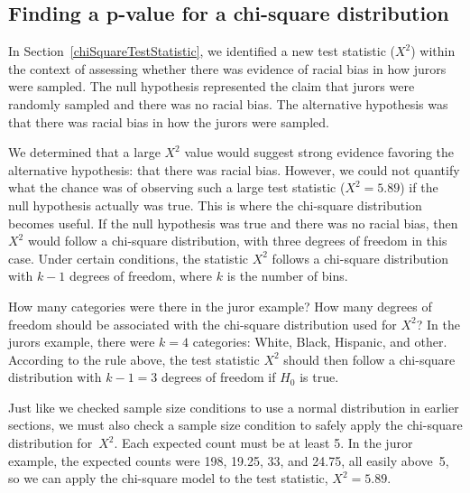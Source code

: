 \D{\newpage}

\subsection{Finding a p-value for a chi-square distribution}
\label{pValueForAChiSquareTest}

In Section~\ref{chiSquareTestStatistic}, we identified a new test statistic ($X^2$) within the context of assessing whether there was evidence of racial bias in how jurors were sampled. The null hypothesis represented the claim that jurors were randomly sampled and there was no racial bias. The alternative hypothesis was that there was racial bias in how the jurors were sampled.

We determined that a large $X^2$ value would suggest strong evidence favoring the alternative hypothesis: that there was racial bias. However, we could not quantify what the chance was of observing such a large test statistic ($X^2=5.89$) if the null hypothesis actually was true. This is where the chi-square distribution becomes useful. If the null hypothesis was true and there was no racial bias, then $X^2$ would follow a chi-square distribution, with three degrees of freedom in this case. Under certain conditions, the statistic $X^2$ follows a chi-square distribution with $k - 1$ degrees of freedom, where $k$ is the number of bins.

\begin{examplewrap}
\begin{nexample}{How many categories were there in the juror example? How many degrees of freedom should be associated with the chi-square distribution used for $X^2$?}
In the jurors example, there were $k=4$ categories: White, Black, Hispanic, and other. According to the rule above, the test statistic $X^2$ should then follow a chi-square distribution with $k-1 = 3$ degrees of freedom if $H_0$ is true.
\end{nexample}
\end{examplewrap}

Just like we checked sample size conditions to use a normal
distribution in earlier sections, we must also check a sample
size condition to safely apply the chi-square distribution
for~$X^2$.
Each expected count must be at least 5. In the juror example,
the expected counts were 198, 19.25, 33, and 24.75, all easily
above~5, so we can apply the chi-square model to the test
statistic, $X^2=5.89$.

